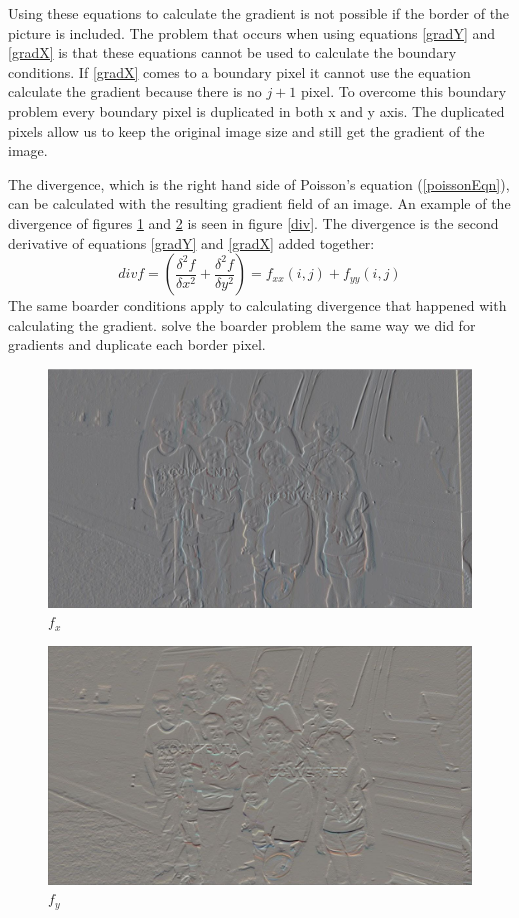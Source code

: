 \documentclass[10pt,twopage]{acmsiggraph}
\begin{document}
Using these equations to calculate the gradient is not possible if the border of the picture is included.  The problem that occurs when using equations \ref{gradY} and \ref{gradX} is that these equations cannot be used to calculate the boundary conditions. If \ref{gradX} comes to a  boundary pixel it cannot use the equation calculate the gradient because there is no $j+1$ pixel. To overcome this boundary problem every boundary pixel is duplicated in both x and y axis. The duplicated pixels allow us to keep the original image size and still get the gradient of the image.

The divergence, which is the right hand side of Poisson's equation (\ref{poissonEqn}), can be calculated with the resulting gradient field of an image. An example of the divergence of figures \ref{ImageX} and \ref{ImageY} is seen in figure \ref{div}. The divergence is the second derivative of equations \ref{gradY} and \ref{gradX} added together:
\begin{equation}
\label{divergence}
div f = ( \frac{\delta^2 f}{\delta x^2} + \frac{\delta^2 f}{\delta y^2} ) = f_{xx}(i,j) + f_{yy}(i,j)
\end{equation}
The same boarder conditions apply to calculating divergence that happened with calculating the gradient. solve the boarder problem the same way we did for gradients and duplicate each border pixel.

\begin{figure}
\centering
\includegraphics[width=.44\textwidth]{fig/gradientX.jpg}
\caption{\ensuremath{f_{x}}}
\label{ImageX}
\end{figure}

\begin{figure}
\centering
\includegraphics[width=.44\textwidth]{fig/gradientY.jpg}
\caption{\ensuremath{f_{y}}}   
\label{ImageY}
\end{figure}
\end{document}
